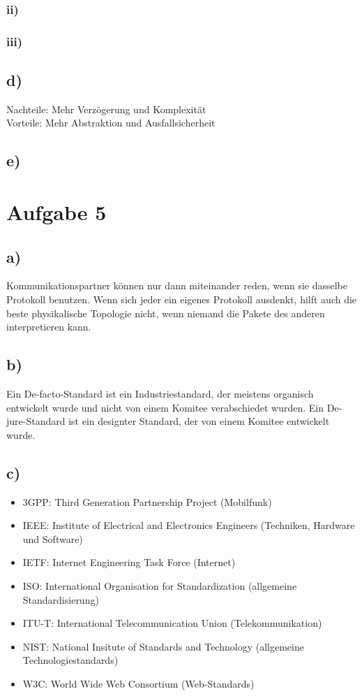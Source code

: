 \documentclass[a4paper,12pt]{scrartcl}
\begin{document}
\subsubsection{ii)}

\subsubsection{iii)}

\subsection{d)}
Nachteile: Mehr Verzögerung und Komplexität \\
Vorteile: Mehr Abstraktion und Ausfallsicherheit

\subsection{e)}

\section{Aufgabe 5}
\subsection{a)}
Kommunikationspartner können nur dann miteinander reden, wenn sie dasselbe
Protokoll benutzen. Wenn sich jeder ein eigenes Protokoll ausdenkt, hilft
auch die beste physikalische Topologie nicht, wenn niemand die Pakete des
anderen interpretieren kann.

\subsection{b)}
Ein De-facto-Standard ist ein Industriestandard, der meistens organisch
entwickelt wurde und nicht von einem Komitee verabschiedet wurden.
Ein De-jure-Standard ist ein designter Standard, der von einem Komitee
entwickelt wurde.

\subsection{c)}
\begin{itemize}
	\item 3GPP: Third Generation Partnership Project (Mobilfunk)
	\item IEEE: Institute of Electrical and Electronics Engineers (Techniken, Hardware und Software)
	\item IETF: Internet Engineering Task Force (Internet)
	\item ISO: International Organisation for Standardization (allgemeine Standardisierung)
	\item ITU-T: International Telecommunication Union (Telekommunikation)
	\item NIST: National Insitute of Standards and Technology (allgemeine Technologiestandards)
	\item W3C: World Wide Web Consortium (Web-Standards)
\end{itemize}
\end{document}
